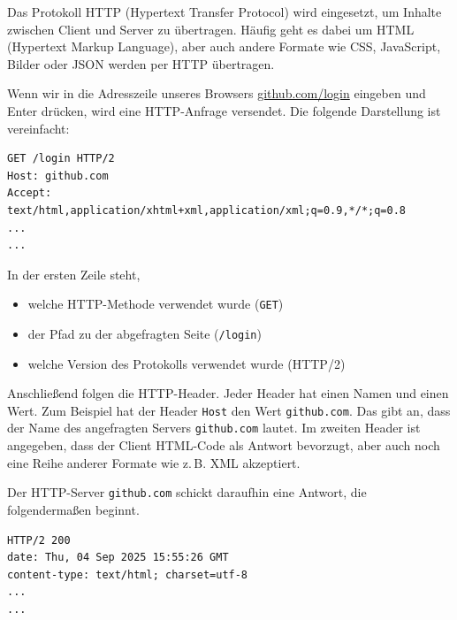 \documentclass[a4paper]{scrartcl}
\begin{document}
Das Protokoll HTTP (Hypertext Transfer Protocol) wird eingesetzt, um Inhalte zwischen Client und Server zu übertragen.
Häufig geht es dabei um HTML (Hypertext Markup Language), aber auch andere Formate wie CSS, JavaScript, Bilder oder JSON werden per HTTP übertragen.



Wenn wir in die Adresszeile unseres Browsers \url{github.com/login} eingeben und Enter drücken, wird eine HTTP-Anfrage versendet.
Die folgende Darstellung ist vereinfacht:

\begin{Verbatim}[label={verb:verbatim2}]
GET /login HTTP/2
Host: github.com
Accept: text/html,application/xhtml+xml,application/xml;q=0.9,*/*;q=0.8
...
...
\end{Verbatim}

In der ersten Zeile steht,
\begin{itemize}
\item  welche HTTP-Methode verwendet wurde (\texttt{GET})
\item  der Pfad zu der abgefragten Seite (\texttt{/login})
\item  welche Version des Protokolls verwendet wurde (HTTP/2)

\end{itemize}

 



Anschließend folgen die HTTP-Header.
Jeder Header hat einen Namen und einen Wert.
Zum Beispiel hat der Header \texttt{Host} den Wert \texttt{github.com}.
Das gibt an, dass der Name des angefragten Servers \texttt{github.com} lautet.
Im zweiten Header ist angegeben, dass der Client HTML-Code als Antwort bevorzugt, aber auch noch eine Reihe anderer Formate wie z.\,B. XML akzeptiert.

Der HTTP-Server \texttt{github.com} schickt daraufhin eine Antwort, die folgendermaßen beginnt.
\begin{Verbatim}[label={verb:verbatim3}]
HTTP/2 200 
date: Thu, 04 Sep 2025 15:55:26 GMT
content-type: text/html; charset=utf-8
...
...
\end{Verbatim}
\end{document}
